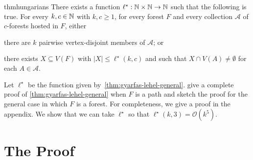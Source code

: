 \documentclass{patmorin}
\newcommand{\gwen}[1]{\textcolor{Purple}{Gwen: #1}}
\newcommand{\piotr}[1]{\textcolor{red}{Piotr: #1}}
\newcommand{\Oh}{\mathcal{O}}
\begin{document}

\begin{restatable}
{thm}{hungarians}\label{thm:gyarfas-lehel-general}
   There exists a function $\ell^\star:\mathbb{N}\times\mathbb{N}\to\mathbb{N}$ such that the following is true. For every $k,c\in\mathbb{N}$ with $k,c\geq1$, for every forest $F$ and 
    every collection $\mathcal{A}$ of $c$-forests hosted in $F$, either
   \begin{tightenum}%
     \item there are $k$ pairwise vertex-disjoint members of $\mathcal{A}$; or
     \item there exists $X \subseteq V(F)$ with 
     $|X|\leq \ell^\star(k,c)$ and such that 
     $X\cap V(A)\neq\emptyset$ for each $A\in\mathcal{A}$. 
   \end{tightenum}
\end{restatable}
Let $\ell^\star$ be the function given by~\cref{thm:gyarfas-lehel-general}. \citet{gyarfas.lehel:helly} give a complete proof of \cref{thm:gyarfas-lehel-general} when $F$ is a path and sketch the proof for the general case in which $F$ is a forest.
For completeness, we give a proof in the appendix. 
We show that we can take $\ell^\star$ so that $\ell^\star(k,3)=\Oh(k^5)$.




\section{The Proof}
\label{proof}
\end{document}
